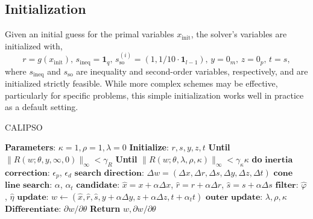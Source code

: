 \subsection{Initialization}

Given an initial guess for the primal variables $x_{\mbox{init}}$, the solver's variables are initialized with, 
\begin{equation} 
  r = g(x_{\mbox{init}}), \,
  s_{\mbox{ineq}} = \mathbf{1}_q, \,
  s_{\mbox{so}}^{(i)} = (1, 1 / 10 \cdot \mathbf{1}_{l-1}), \,
  y = 0_m, \,
  z = 0_p, \,
  t = s, \label{calipso_initialize}
\end{equation}
where $s_{\mbox{ineq}}$ and $s_{\mbox{so}}$ are inequality and second-order variables, respectively, and are initialized strictly feasible. While more complex schemes may be effective, particularly for specific problems, this simple initialization works well in practice as a default setting.

\begin{algorithm}[H]
	\caption{CALIPSO}\label{calipso_algorithm}
	\begin{algorithmic}[H]
		\State \textbf{Parameters}: $\kappa = 1, \rho = 1, \lambda = 0$
		\State \textbf{Initialize}: $r, s, y, z, t$
		\State \textbf{Until} $\| R(w; \theta, y, \infty, 0) \|_{\infty} < \gamma_R$
		\State \indent \textbf{Until} $\|R(w; \theta, \lambda, \rho, \kappa)\|_{\infty} < \gamma_{\kappa} \kappa$ \textbf{do}
		\State \indent \indent $\mathbf{inertia}$ $\mathbf{correction}$: $\epsilon_p$, $\epsilon_d$ 
		\State \indent \indent $\mathbf{search}$ $\mathbf{direction}$: $\Delta w = (\Delta x, \Delta r, \Delta s, \Delta y, \Delta z, \Delta t)$ 
		\State \indent \indent $\mathbf{cone}$ $\mathbf{line}$ $\mathbf{search}$: $\alpha$, $\alpha_t$
		\State \indent \indent $\mathbf{candidate}$: $\hat{x} = x + \alpha \Delta x$, $\hat{r} = r + \alpha \Delta r$, $\hat{s} = s + \alpha \Delta s$
		\State \indent \indent $\mathbf{filter}$: $\hat{\varphi}$, $\hat{\eta}$
		\State \indent \indent $\mathbf{update}$: $w \leftarrow (\hat{x}, \hat{r}, \hat{s}, y + \alpha \Delta y, z + \alpha \Delta z, t + \alpha_t t)$
		\State \indent $\mathbf{outer}$ $\mathbf{update}$: $\lambda, \rho, \kappa$ 
		\State $\mathbf{Differentiate}$: $\partial w / \partial \theta$ 
		\State \textbf{Return} $w, \partial w / \partial \theta$
		\EndProcedure
	\end{algorithmic}
\end{algorithm}


